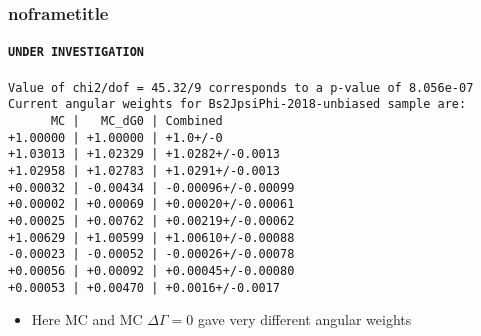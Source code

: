 \documentclass[aspectratio=43]{beamer}
\begin{document}
\addtocounter{framenumber}{-1}
\begin{frame}
\frametitle{noframetitle}
\framesubtitle{ \texttt{\color{scqred}UNDER INVESTIGATION} }

\footnotesize

\begin{verbatim}
Value of chi2/dof = 45.32/9 corresponds to a p-value of 8.056e-07
Current angular weights for Bs2JpsiPhi-2018-unbiased sample are:
      MC |   MC_dG0 | Combined
+1.00000 | +1.00000 | +1.0+/-0
+1.03013 | +1.02329 | +1.0282+/-0.0013
+1.02958 | +1.02783 | +1.0291+/-0.0013
+0.00032 | -0.00434 | -0.00096+/-0.00099
+0.00002 | +0.00069 | +0.00020+/-0.00061
+0.00025 | +0.00762 | +0.00219+/-0.00062
+1.00629 | +1.00599 | +1.00610+/-0.00088
-0.00023 | -0.00052 | -0.00026+/-0.00078
+0.00056 | +0.00092 | +0.00045+/-0.00080
+0.00053 | +0.00470 | +0.0016+/-0.0017
\end{verbatim}

\normalsize

\begin{itemize}
  \item Here MC and MC $\Delta\Gamma = 0$ gave very different angular weights
\end{itemize}

\end{frame}





\end{document}
